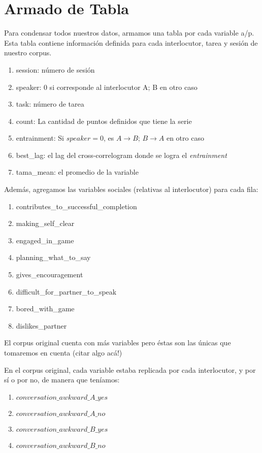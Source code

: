 \section{Armado de Tabla}

Para condensar todos nuestros datos, armamos una tabla por cada variable a/p. Esta tabla contiene información definida para cada interlocutor, tarea y sesión de nuestro corpus.

\begin{enumerate}
  \item session: número de sesión
  \item speaker: 0 si corresponde al interlocutor A; B en otro caso
  \item task: número de tarea
  \item count: La cantidad de puntos definidos que tiene la serie
  \item entrainment: Si $speaker=0$, es $A\rightarrow B$; $B \rightarrow A$ en otro caso
  \item best\_lag: el lag del cross-correlogram donde se logra el \emph{entrainment}
  \item tama\_mean: el promedio de la variable
\end{enumerate}

Además, agregamos las variables sociales (relativas al interlocutor) para cada fila:

\begin{enumerate}
\item contributes\_to\_successful\_completion
\item making\_self\_clear
\item engaged\_in\_game
\item planning\_what\_to\_say
\item gives\_encouragement
\item difficult\_for\_partner\_to\_speak
\item bored\_with\_game
\item dislikes\_partner
\end{enumerate}

El corpus original cuenta con más variables pero éstas son las únicas que tomaremos en cuenta (citar algo acá!)

En el corpus original, cada variable estaba replicada por cada interlocutor, y por sí o por no, de manera que teníamos:

\begin{enumerate}
  \item $conversation\_awkward\_A\_yes$
  \item $conversation\_awkward\_A\_no$
  \item $conversation\_awkward\_B\_yes$
  \item $conversation\_awkward\_B\_no$
\end{enumerate}


